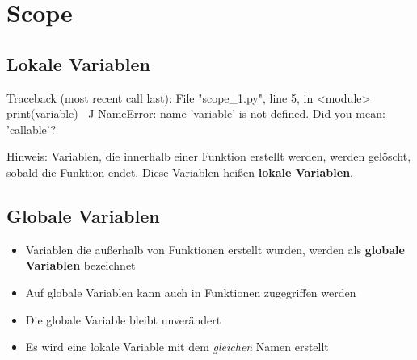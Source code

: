 \livecoding

\subtitle{Kapitel 6: wie Funktionen funktionieren}

\section{Scope}
\subsection{Lokale Variablen}
\begin{frame}[fragile]
    \slidehead
    \vspace{-1em}
    \pause
    \vspace{-1em}
    \begin{commandshell}[fontsize=\footnotesize][minted language=text,top=0cm,bottom=0cm]
        Traceback (most recent call last):
        File "scope_1.py", line 5, in <module>
            print(variable)
                ^^^^^^^^
        NameError: name 'variable' is not defined. Did you mean: 'callable'?
    \end{commandshell}
    \vspace{-1em}
    \vfill
    \begin{block}{Hinweis:}
        Variablen, die innerhalb einer Funktion erstellt werden, werden gelöscht, sobald die Funktion endet.
        Diese Variablen heißen \textbf{lokale Variablen}.
    \end{block}
\end{frame}

\subsection{Globale Variablen}
\begin{frame}
    \slidehead
    \begin{itemize}
        \item Variablen die außerhalb von Funktionen erstellt wurden, werden als \textbf{globale Variablen} bezeichnet
        \item Auf globale Variablen kann auch in Funktionen zugegriffen werden
    \end{itemize}
\end{frame}

\begin{frame}
    \slidehead
    \begin{itemize}
        \item Die globale Variable  bleibt unverändert
        \item Es wird eine lokale Variable mit dem \textit{gleichen} Namen erstellt
    \end{itemize}
\end{frame}

